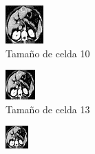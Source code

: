 \documentclass[a4paper]{article}
\begin{document}
\begin{figure}
\centering
\begin{subfigure}{0.4\linewidth}
  \centering
  \includegraphics[width=0.6\linewidth]{celdas/tomo2-10-0}
  \caption{Tamaño de celda 10}
\end{subfigure}%
\begin{subfigure}{0.4\linewidth}
  \centering
  \includegraphics[width=0.6\linewidth]{celdas/tomo2-13-0}
  \caption{Tamaño de celda 13}
\end{subfigure}
\begin{subfigure}{0.4\linewidth}
  \centering
  \includegraphics[width=0.6\linewidth]{celdas/tomo2-17-0}

\end{subfigure}
\end{figure}
\end{document}
